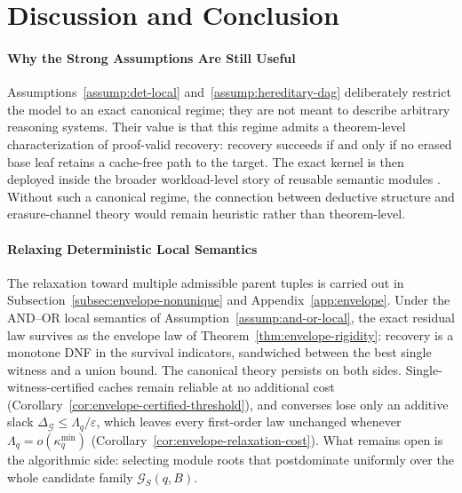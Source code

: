\documentclass[journal]{IEEEtran}
\numberwithin{equation}{section}
\begin{document}
\section{Discussion and Conclusion}
\label{sec:discussion}

\paragraph{Why the Strong Assumptions Are Still Useful}
\label{para:discussion-strong-assumption}
Assumptions~\ref{assump:det-local} and~\ref{assump:hereditary-dag}
deliberately restrict the model to an exact canonical regime; they are not
meant to describe arbitrary reasoning systems.  Their value is that this
regime admits a theorem-level characterization of proof-valid recovery:
recovery succeeds if and only if no erased base leaf retains a cache-free
path to the target.  The exact kernel is then deployed inside the broader
workload-level story of reusable semantic modules
\cite{brachman2004knowledge,darwiche2002knowledge}.  Without such a
canonical regime, the connection between deductive structure and
erasure-channel theory would remain heuristic rather than theorem-level.

\paragraph{Relaxing Deterministic Local Semantics}
\label{para:discussion-nondeterminism}
The relaxation toward multiple admissible parent tuples is carried out in
Subsection~\ref{subsec:envelope-nonunique} and
Appendix~\ref{app:envelope}.  Under the AND--OR local semantics of
Assumption~\ref{assump:and-or-local}, the exact residual law survives as
the envelope law of Theorem~\ref{thm:envelope-rigidity}: recovery is a
monotone DNF in the survival indicators, sandwiched between the best
single witness and a union bound.  The canonical theory persists on both
sides.  Single-witness-certified caches remain reliable at no additional
cost (Corollary~\ref{cor:envelope-certified-threshold}), and converses
lose only an additive slack \(\Delta_{\mathcal G}\le\Lambda_q/\varepsilon\),
which leaves every first-order law unchanged whenever
\(\Lambda_q=o(\kappa_q^{\min})\)
(Corollary~\ref{cor:envelope-relaxation-cost}).
What remains open is the
algorithmic side: selecting module roots that postdominate uniformly over
the whole candidate family \(\mathcal G_S(q,B)\).
\end{document}
